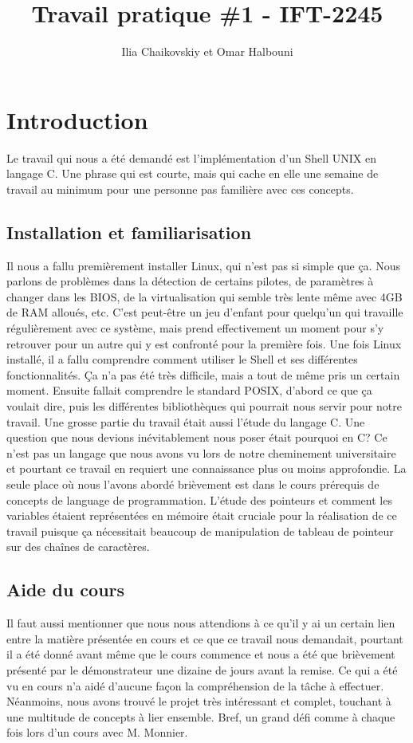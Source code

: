 \documentclass{article}
\title{Travail pratique \#1 - IFT-2245}
\author{Ilia Chaikovskiy et Omar Halbouni}
\begin{document}
\maketitle

\section{Introduction}

Le travail qui nous a été demandé est l’implémentation d’un Shell UNIX en langage C. Une phrase qui est courte, mais qui cache en elle une semaine de travail au minimum pour une personne pas familière avec ces concepts. 

\subsection{Installation et familiarisation}

Il nous a fallu premièrement installer Linux, qui n’est pas si simple que ça. Nous parlons de problèmes dans la détection de certains pilotes, de paramètres à changer dans les BIOS, de la virtualisation qui semble très lente même avec 4GB de RAM alloués, etc. C’est peut-être un jeu d’enfant pour quelqu’un qui travaille régulièrement avec ce système, mais prend effectivement un moment pour s’y retrouver pour un autre qui y est confronté pour la première fois.  Une fois Linux installé, il a fallu comprendre comment utiliser le Shell et ses différentes fonctionnalités. Ça n’a pas été très difficile, mais a tout de même pris un certain moment. Ensuite fallait comprendre le standard POSIX, d'abord ce que ça voulait dire, puis les différentes bibliothèques qui pourrait nous servir pour notre travail. Une grosse partie du travail était aussi l’étude du langage C. Une question que nous devions inévitablement nous poser était pourquoi en C? Ce n’est pas un langage que nous avons vu lors de notre cheminement universitaire et pourtant ce travail en requiert une connaissance plus ou moins approfondie. La seule place où nous l’avons abordé brièvement est dans le cours prérequis de concepts de language de programmation. L'étude des pointeurs et comment les variables étaient représentées en mémoire était cruciale pour la réalisation de ce travail puisque ça nécessitait beaucoup de manipulation de tableau de pointeur sur des chaînes de caractères.

\subsection{Aide du cours}
Il faut aussi mentionner que nous nous attendions à ce qu'il y ai un certain lien entre la matière présentée en cours et ce que ce travail nous demandait, pourtant il a été donné avant même que le cours commence et nous a été que brièvement présenté par le démonstrateur une dizaine de jours avant la remise. Ce qui a été vu en cours n’a aidé d'aucune façon la compréhension de la tâche à effectuer. Néanmoins, nous avons trouvé le projet très intéressant et complet, touchant à une multitude de concepts à lier ensemble. Bref, un grand défi comme à chaque fois lors d’un cours avec M. Monnier.
\end{document}
